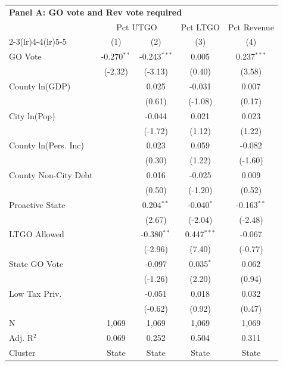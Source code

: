 \begingroup
\centering
\begin{tabular*}{\textwidth}{@{\extracolsep{\fill}}lcccc}
\multicolumn{5}{l}{\textbf{Panel A: GO vote and Rev vote required}}\\

\addlinespace
   \toprule
    & \multicolumn{2}{c}{Pct UTGO} & Pct LTGO & Pct Revenue\\
   \cmidrule(lr){2-3}\cmidrule(lr){4-4}\cmidrule(lr){5-5}
                        & (1)           & (2)            & (3)           & (4)\\  
   \midrule 
   GO Vote              & -0.270$^{**}$ & -0.243$^{***}$ & 0.005         & 0.237$^{***}$\\   
                        & (-2.32)      & (-3.13)       & (0.40)       & (3.58)\\   
   County ln(GDP)       &               & 0.025          & -0.031        & 0.007\\   
                        &               & (0.61)        & (-1.08)      & (0.17)\\   
   City ln(Pop)         &               & -0.044         & 0.021         & 0.023\\   
                        &               & (-1.72)       & (1.12)       & (1.22)\\   
   County ln(Pers. Inc) &               & 0.023          & 0.059         & -0.082\\   
                        &               & (0.30)        & (1.22)       & (-1.60)\\   
   County Non-City Debt &               & 0.016          & -0.025        & 0.009\\   
                        &               & (0.50)        & (-1.20)      & (0.52)\\   
   Proactive State      &               & 0.204$^{**}$   & -0.040$^{*}$  & -0.163$^{**}$\\   
                        &               & (2.67)        & (-2.04)      & (-2.48)\\   
   LTGO Allowed         &               & -0.380$^{**}$  & 0.447$^{***}$ & -0.067\\   
                        &               & (-2.96)       & (7.40)       & (-0.77)\\   
   State GO Vote        &               & -0.097         & 0.035$^{*}$   & 0.062\\   
                        &               & (-1.26)       & (2.20)       & (0.94)\\   
   Low Tax Priv.        &               & -0.051         & 0.018         & 0.032\\   
                        &               & (-0.62)       & (0.92)       & (0.47)\\   
   \hline
   N         & 1,069         & 1,069          & 1,069         & 1,069\\  
   Adj. R$^2$       & 0.069         & 0.252          & 0.504         & 0.311\\  
   Cluster              & State & State & State & State\\  
   \bottomrule
\end{tabular*}
\par\endgroup
